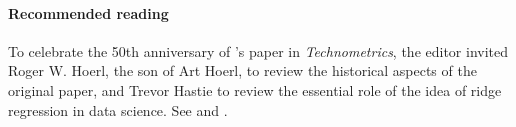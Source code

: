  
\paragraph{Recommended reading}

To celebrate the 50th anniversary of  \citet{hoerl1970ridge}'s paper in {\it Technometrics}, the editor invited Roger W. Hoerl,  the son of Art Hoerl, to review the historical aspects of the original paper, and Trevor Hastie to review the essential role of the idea of ridge regression in data science. See \citet{hoerl2020ridge} and \citet{hastie2020ridge}. 
 

